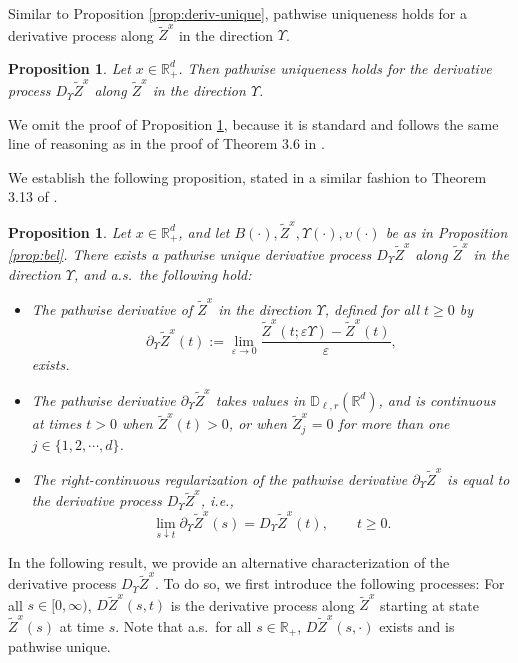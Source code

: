 \documentclass[11pt]{article}
\theoremstyle{definition}
\theoremstyle{plain}
\newtheorem{proposition}[assumption]{Proposition}
\newcommand{\R}{\mathbb{R}}
\newcommand{\D}{\mathbb{D}}
\begin{document}
Similar to Proposition \ref{prop:deriv-unique}, pathwise uniqueness holds for a derivative process along \( \tilde{Z}^x \) in the direction \( \Upsilon \). 


\begin{proposition}\label{prop:deriv-M-unique}
Let \( x \in \mathbb{R}_+^d \). Then pathwise uniqueness holds for the derivative process \( D_\Upsilon \tilde{Z}^x \) along \( \tilde{Z}^x \) in the direction \( \Upsilon \).
\end{proposition}
We omit the proof of Proposition \ref{prop:deriv-M-unique}, because it is standard 
and follows the same line of reasoning as in the proof of Theorem 3.6 in \cite{LipshutzRamanan2019b}.

We establish the following proposition, stated in a similar fashion to Theorem 3.13 of \cite{LipshutzRamanan2019b}. 
\begin{proposition}\label{prop:bel2}
Let $x \in \R_+^d$, and let \( B(\cdot), \tilde{Z}^x, \Upsilon(\cdot), \upsilon(\cdot) \) be as in Proposition \ref{prop:bel}.
There exists a pathwise unique derivative process \( D_\Upsilon \tilde{Z}^x \) along \( \tilde{Z}^x \) in the direction \( \Upsilon \), and a.s.\ the following hold:
\begin{itemize}
  \item[(i)] The pathwise derivative of \( \tilde{Z}^x \) in the direction \( \Upsilon \), defined for all \( t \ge 0 \) by
  \[
  \partial_\Upsilon \tilde{Z}^x(t) := \lim_{\varepsilon \to 0} \frac{\tilde{Z}^x(t; \varepsilon \Upsilon) - \tilde{Z}^x(t)}{\varepsilon},
  \]
  exists.
  \item[(ii)] The pathwise derivative \( \partial_\Upsilon \tilde{Z}^x \) takes values in \( \D_{\ell, r}(\mathbb{R}^d) \), and is continuous at times \( t > 0 \) 
  when $\tilde Z^x(t) > 0$, or when $\tilde Z^x_j = 0$ for more than one $j \in \{1, 2, \cdots, d\}$.

  \item[(iii)] The right-continuous regularization of the pathwise derivative \( \partial_\Upsilon \tilde{Z}^x \) is equal to the derivative process \( D_\Upsilon \tilde{Z}^x \), i.e.,
  \[
  \lim_{s \downarrow t} \partial_\Upsilon \tilde{Z}^x(s) = D_\Upsilon \tilde{Z}^x(t), \qquad t \ge 0.
  \]
\end{itemize}
\end{proposition}




In the following result, we provide an alternative characterization of the derivative process \( D_\Upsilon \tilde{Z}^x \). 
To do so, we first introduce the following processes:
For all \( s \in [0,\infty) \), \( D \tilde Z^x (s,t) \) is the derivative process along \( \tilde{Z}^x \) starting at state \( \tilde{Z}^x(s) \) at time \( s \).  
Note that a.s.\ for all \( s \in \mathbb{R}_+ \), \( D {\tilde{Z}^x}(s, \cdot) \) exists and is pathwise unique.
\end{document}
